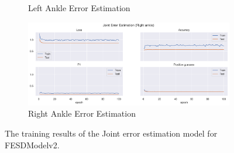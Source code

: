 \begin{figure}[!ht]
\begin{subfigure}[b]{0.47\linewidth}
        \caption{Left Ankle Error Estimation}
        \label{fig:v2_lean_jt_ee}
    \end{subfigure}
    \hfill
    \begin{subfigure}[b]{0.47\linewidth}
        \centering
        \includegraphics[width=\textwidth]{figures/Results/v2_bs_40_is_64_e_100/jt/Right ankle_ErrorEstimation.png}
        \caption{Right Ankle Error Estimation}
        \label{fig:v2_rian_jt_ee}
    \end{subfigure}
    \caption[Detailed Training results for FESDModelv2]{The training results of the Joint error estimation model for FESDModelv2.}
  \end{figure}